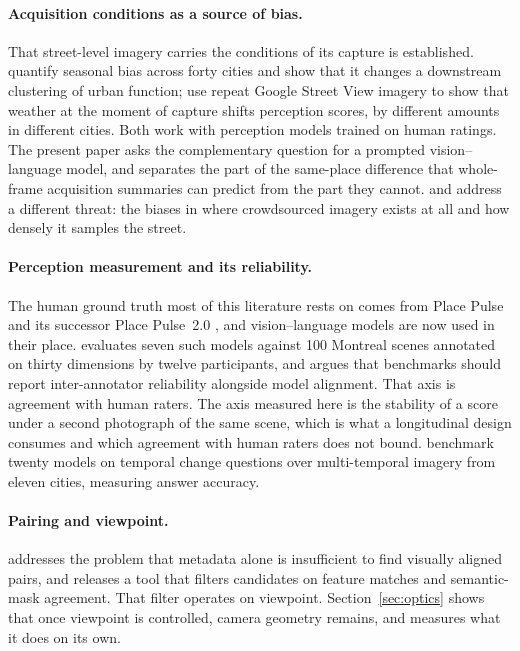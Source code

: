 \paragraph{Acquisition conditions as a source of bias.}
That street-level imagery carries the conditions of its capture is established.
\citet{zhao2025seasonal} quantify seasonal bias across forty cities and show
that it changes a downstream clustering of urban function;
\citet{ki2026weather} use repeat Google Street View imagery to show that weather
at the moment of capture shifts perception scores, by different amounts in
different cities. Both work with perception models trained on human ratings. The
present paper asks the complementary question for a prompted vision--language
model, and separates the part of the same-place difference that whole-frame
acquisition summaries can predict from the part they cannot.
\citet{alpherts2025artifacts} and \citet{fan2025coverage} address a different
threat: the biases in where crowdsourced imagery exists at all and how densely
it samples the street.

\paragraph{Perception measurement and its reliability.}
The human ground truth most of this literature rests on comes from Place Pulse
\citep{salesses2013collaborative} and its successor Place Pulse~2.0
\citep{dubey2016deep}, and vision--language models are now used in their place.
\citet{mushkani2026benchmarks} evaluates seven such models
against 100 Montreal scenes annotated on thirty dimensions by twelve
participants, and argues that benchmarks should report inter-annotator
reliability alongside model alignment. That axis is agreement with human
raters. The axis measured here is the stability of a score under a second
photograph of the same scene, which is what a longitudinal design consumes and
which agreement with human raters does not bound.
\citet{he2026urbanfeel} benchmark twenty models on temporal change questions
over multi-temporal imagery from eleven cities, measuring answer accuracy.

\paragraph{Pairing and viewpoint.}
\citet{torkko2026pairwise} addresses the problem that metadata alone is
insufficient to find visually aligned pairs, and releases a tool that filters
candidates on feature matches and semantic-mask agreement. That filter operates
on viewpoint. Section~\ref{sec:optics} shows that once viewpoint is controlled,
camera geometry remains, and measures what it does on its own.

